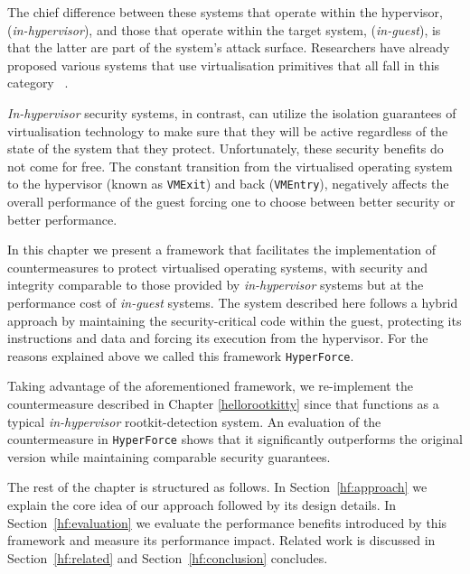 The chief difference between these systems that operate within the hypervisor, (\textit{in-hypervisor}), and those that operate within the target system, (\textit{in-guest}), is that the latter are part of the system's attack surface. Researchers have already proposed various systems that use virtualisation primitives that all fall in this category ~\cite{Criswell2007, Dewant2008, copilot, NICKLE, qubesos}.

\textit{In-hypervisor} security systems, in contrast, can utilize the isolation guarantees of virtualisation technology to make sure that they will be active regardless of the state of the system that they protect. 
Unfortunately, these security benefits do not come for free. The constant transition from the virtualised operating system to the hypervisor (known as \texttt{VMExit}) and back (\texttt{VMEntry}), negatively affects the overall performance of the guest forcing one to choose between better security or better performance.

In this chapter we present a framework that facilitates the implementation of countermeasures to protect virtualised operating systems, with security and integrity comparable to those provided by \textit{in-hypervisor} systems but at the performance cost of \textit{in-guest} systems. The system described here follows a hybrid approach by maintaining the security-critical code within the guest, protecting its instructions and data and forcing its execution from the hypervisor. For the reasons explained above we called this framework \texttt{HyperForce}.

Taking advantage of the aforementioned framework, we re-implement the countermeasure described in Chapter \ref{hellorootkitty} since that functions as a typical \textit{in-hypervisor} rootkit-detection system. An evaluation of the countermeasure in \texttt{HyperForce} shows that it significantly outperforms the original version while maintaining comparable security guarantees.

The rest of the chapter is structured as follows. In Section~\ref{hf:approach} we explain the core idea of our approach followed by its design details. In Section~\ref{hf:evaluation} we evaluate the performance benefits introduced by this framework and measure its performance impact. Related work is discussed in Section~\ref{hf:related} and Section~\ref{hf:conclusion} concludes.

